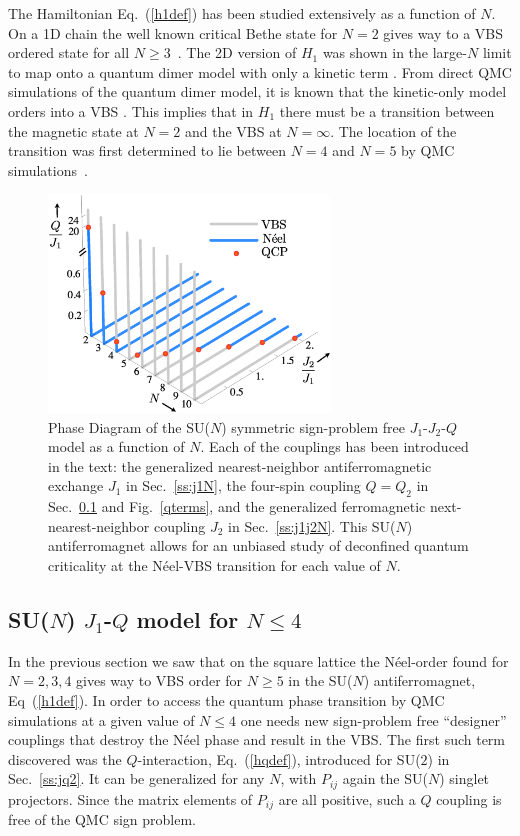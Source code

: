 \documentclass[10pt,pre,aps,twocolumn,showpacs,subscriptaddresses,floatfix]{revtex4}
\begin{document}
The Hamiltonian Eq.~(\ref{h1def}) has been studied extensively as a function of $N$. On a 1D chain the well known critical Bethe state for $N=2$ gives way to a 
VBS ordered state for all $N\geq 3$~\cite{barber1989:d1n3_vbs,klumper1989:d1n3_vbs,affleck1985:lgN}. The 2D version of $H_{1}$ was shown 
in the large-$N$ limit to map onto a quantum dimer model with only a kinetic term \cite{read1989:nucphysB}. From direct QMC simulations of the quantum dimer model, 
it is known that the kinetic-only model orders into a VBS \cite{sachdev1989:qd_vbs}.  This implies that in $H_{1}$ there must be a transition between the 
magnetic state at $N=2$ and the VBS at $N=\infty$.  The location of the transition was first determined to lie between $N=4$ and $N=5$ 
by QMC simulations~\cite{harada2003:sun,Kawashima07}.

\begin{figure}
\includegraphics[width=7.5cm, clip]{fig06.eps}
  \caption{ \label{fig:pdj1j2q} Phase Diagram of the SU($N$) symmetric sign-problem free
    $J_1$-$J_2$-$Q$ model as a function of $N$. Each of the couplings has been introduced
    in the text: the generalized nearest-neighbor antiferromagnetic exchange $J_1$ in Sec.~\ref{ss:j1N}, the four-spin coupling $Q=Q_2$ in 
    Sec.~\ref{ss:jqN} and Fig.~\ref{qterms}, and the generalized ferromagnetic next-nearest-neighbor coupling $J_2$ in Sec.~\ref{ss:j1j2N}. 
    This SU($N$) antiferromagnet allows for an unbiased study of deconfined quantum
    criticality at the N\'eel-VBS transition for each value of $N$. }
\end{figure}


\subsection{SU($N$) $J_1$-$Q$ model for $N\leq 4$}
\label{ss:jqN}

In the previous section we saw that on the square lattice the N\'eel-order found for $N=2,3,4$ gives way to VBS
order for $N\geq 5$ in the SU($N$) antiferromagnet, Eq~(\ref{h1def}). In order to access the quantum phase transition by QMC simulations at a 
given value of $N\leq 4$ one needs new sign-problem free ``designer'' couplings that destroy the N\'eel phase and result in the VBS. The first such term discovered 
was the $Q$-interaction, Eq.~(\ref{hqdef}), introduced for SU($2$) in Sec.~\ref{ss:jq2}. It can be generalized for any $N$, with $P_{ij}$ again 
the SU($N$) singlet projectors. Since the matrix elements of $P_{ij}$ are all positive, such a $Q$ coupling is free of the QMC sign problem. 
\end{document}
